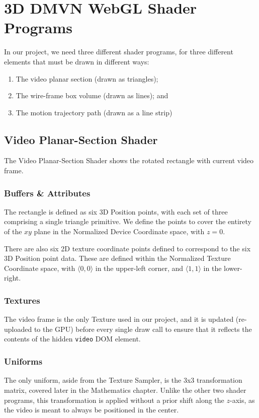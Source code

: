 \section{3D DMVN WebGL Shader Programs}
In our project, we need three different shader programs, for three different elements that must be drawn in different ways:
\begin{enumerate}
    \item The video planar section (drawn as triangles);
    \item The wire-frame box volume (drawn as lines); and
    \item The motion trajectory path (drawn as a line strip)
\end{enumerate}

\subsection{Video Planar-Section Shader}
The Video Planar-Section Shader shows the rotated rectangle with current video frame.

\subsubsection{Buffers \& Attributes}
The rectangle is defined as six 3D Position points, with each set of three comprising a single triangle primitive. We define the points to cover the entirety of the $xy$ plane in the Normalized Device Coordinate space, with $z=0$.
\par There are also six 2D texture coordinate points defined to correspond to the six 3D Position point data. These are defined within the Normalized Texture Coordinate space, with $\langle 0,0 \rangle$ in the upper-left corner, and $\langle 1,1 \rangle$ in the lower-right.

\subsubsection{Textures}
The video frame is the only Texture used in our project, and it is updated (re-uploaded to the GPU) before every single draw call to ensure that it reflects the contents of the hidden \texttt{video} DOM element.

\subsubsection{Uniforms}
The only uniform, aside from the Texture Sampler, is the 3x3 transformation matrix, covered later in the Mathematics chapter. Unlike the other two shader programs, this transformation is applied without a prior shift along the $z$-axis, as the video is meant to always be positioned in the center.

